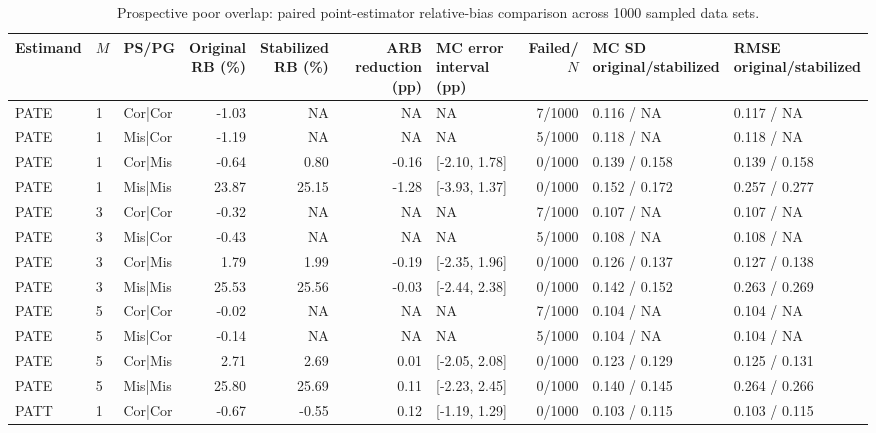 \begin{table}
\centering\footnotesize
\caption{Prospective poor overlap: paired point-estimator relative-bias comparison across 1000 sampled data sets.}
\setlength{\tabcolsep}{3pt}
\renewcommand{\arraystretch}{1.12}
\begin{tabular}{lllr r r l r l l}
\toprule
Estimand & $M$ & PS/PG & \shortstack{Original\\RB (\%)} & \shortstack{Stabilized\\RB (\%)} & \shortstack{ARB reduction\\(pp)} & \shortstack{MC error interval\\(pp)} & Failed/$N$ & \shortstack{MC SD\\original/stabilized} & \shortstack{RMSE\\original/stabilized} \\
\midrule
PATE & 1 & Cor|Cor & -1.03 & NA & NA & NA & 7/1000 & 0.116 / NA & 0.117 / NA \\
PATE & 1 & Mis|Cor & -1.19 & NA & NA & NA & 5/1000 & 0.118 / NA & 0.118 / NA \\
PATE & 1 & Cor|Mis & -0.64 & 0.80 & -0.16 & [-2.10, 1.78] & 0/1000 & 0.139 / 0.158 & 0.139 / 0.158 \\
PATE & 1 & Mis|Mis & 23.87 & 25.15 & -1.28 & [-3.93, 1.37] & 0/1000 & 0.152 / 0.172 & 0.257 / 0.277 \\
PATE & 3 & Cor|Cor & -0.32 & NA & NA & NA & 7/1000 & 0.107 / NA & 0.107 / NA \\
PATE & 3 & Mis|Cor & -0.43 & NA & NA & NA & 5/1000 & 0.108 / NA & 0.108 / NA \\
PATE & 3 & Cor|Mis & 1.79 & 1.99 & -0.19 & [-2.35, 1.96] & 0/1000 & 0.126 / 0.137 & 0.127 / 0.138 \\
PATE & 3 & Mis|Mis & 25.53 & 25.56 & -0.03 & [-2.44, 2.38] & 0/1000 & 0.142 / 0.152 & 0.263 / 0.269 \\
PATE & 5 & Cor|Cor & -0.02 & NA & NA & NA & 7/1000 & 0.104 / NA & 0.104 / NA \\
PATE & 5 & Mis|Cor & -0.14 & NA & NA & NA & 5/1000 & 0.104 / NA & 0.104 / NA \\
PATE & 5 & Cor|Mis & 2.71 & 2.69 & 0.01 & [-2.05, 2.08] & 0/1000 & 0.123 / 0.129 & 0.125 / 0.131 \\
PATE & 5 & Mis|Mis & 25.80 & 25.69 & 0.11 & [-2.23, 2.45] & 0/1000 & 0.140 / 0.145 & 0.264 / 0.266 \\
PATT & 1 & Cor|Cor & -0.67 & -0.55 & 0.12 & [-1.19, 1.29] & 0/1000 & 0.103 / 0.115 & 0.103 / 0.115 \\

\end{tabular}
\end{table}
